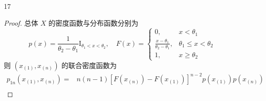 \documentclass[normal,founder,mtpro2,cn]{elegantnote}
\begin{document}
\begin{enumerate}
\begin{proof}
            选取枢轴量
            \begin{equation*}
                \chi^{2}=2n\lambda\bar{x}\sim\chi^{2}(2n)
            \end{equation*}
            给定置信度 $1-\alpha$, 即
            \begin{equation*}
                P\left\{\chi_{\alpha/2}^{2}(2n)\leq 2n\lambda\bar{x}\leq\chi_{1-\alpha/2}^{2}(2n)\right\}=1-\alpha
            \end{equation*}
            则
            \begin{equation*}
                \chi_{\alpha/2}^{2}(2n)\leq 2n\lambda\bar{x}\leq\chi_{1-\alpha/2}^{2}(2n)
            \end{equation*}
            即
            \begin{equation*}
                \frac{\chi_{\alpha/2}^{2}(2n)}{2n\bar{x}}\leq\lambda\leq\frac{\chi_{1-\alpha/2}^{2}(2n)}{2n\bar{x}}
            \end{equation*}
            故$\lambda$ 的置信水平为 $1-\alpha$ 的置信区间为
            \begin{equation*}
                \left[\frac{\chi_{\alpha/2}^{2}(2n)}{2n\bar{x}},\frac{\chi_{1-\alpha/2}^{2}(2n)}{2n\bar{x}}\right]
            \end{equation*}
        \end{proof}
    \item[17]
        \begin{proof}
            总体 $X$ 的密度函数与分布函数分别为
            \begin{equation*}
                p(x)=\frac{1}{\theta_{2}-\theta_{1}}\mathrm{I}_{\theta_{1}<x<\theta_{2}},\quad
                F(x)=\left\{\begin{aligned}
                    0,                                          & x<\theta_{1}                \\
                    \frac{x-\theta_{1}}{\theta_{2}-\theta_{1}}, & \theta_{1}\leq x<\theta_{2} \\
                    1,                                          & x \geq \theta_{2}
                \end{aligned}\right.
            \end{equation*}
            则 $\left(x_{(1)},x_{(n)}\right)$ 的联合密度函数为
            \begin{equation*}
                \begin{aligned}
                    p_{1n}\left(x_{(1)},x_{(n)}\right)= & n(n-1)\left[F\left(x_{(n)}\right)-F\left(x_{(1)}\right)\right]^{n-2}p\left(x_{(1)}\right)p\left(x_{(n)}\right)                             \\

\end{aligned}
\end{equation*}
\end{proof}
\end{enumerate}
\end{document}
